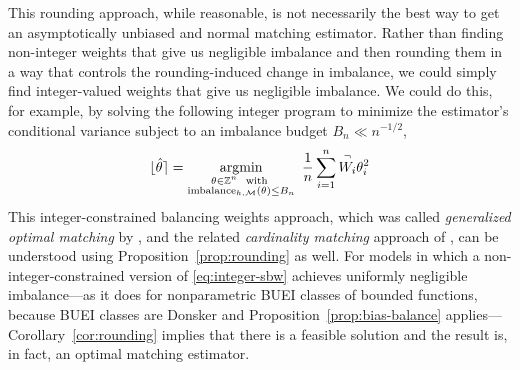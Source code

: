 \documentclass{article}
\DeclareMathOperator*{\argmin}{argmin}
\theoremstyle{definition}
\newtheorem{proposition}[theorem]{Proposition}
\DeclareMathOperator{\Var}{var}
\DeclarePairedDelimiter\round{\lfloor}{\rceil}
\DeclarePairedDelimiter\floor{\lfloor}{\rfloor}
\DeclareMathOperator{\imbalance}{imbalance}
\newcommand{\model}{\mathcal{M}}
\newcommand{\<}{\langle}
\renewcommand{\>}{\rangle}
\begin{document}




This rounding approach, while reasonable, is not necessarily the best way to get an asymptotically unbiased and normal matching estimator.
Rather than finding non-integer weights that give us negligible imbalance and then rounding them in a way that controls the rounding-induced change in imbalance, we could simply find integer-valued weights that give us negligible imbalance.
We could do this, for example, by solving the following integer program to minimize the estimator's conditional variance subject to an imbalance budget $B_n \ll n^{-1/2}$,
\begin{equation}
\label{eq:integer-sbw}
\round{\hat\theta} = \argmin_{\substack{\theta\in\mathbb{Z}^n \ \text{ with } \\ \imbalance_{h, \model}(\theta) \leq B_n}} \  \frac1n\sum_{i=1}^n \overset{\neg}{W_i} \theta_i^2
\end{equation}
This integer-constrained balancing weights approach, which was called \emph{generalized optimal matching} by \citet{kallus2016generalized},
and the related \emph{cardinality matching} approach of \citet{zubizarreta2014matching}, can be understood using Proposition~\ref{prop:rounding} as well. For models in which a non-integer-constrained version of \eqref{eq:integer-sbw} achieves uniformly negligible imbalance---as it does for nonparametric BUEI classes of bounded functions, because BUEI classes are Donsker and Proposition~\ref{prop:bias-balance} applies---Corollary~\ref{cor:rounding} implies that there is a feasible solution and the result is, in fact, an optimal matching estimator.
\end{document}
